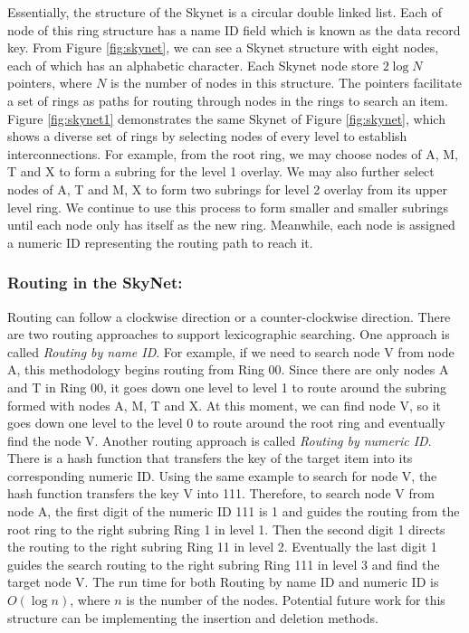 \documentclass[oribibl]{llncs}
\begin{document}
Essentially, the structure of the Skynet is a circular double linked list. Each of node of this ring structure has a name ID field which is known as the data record key. From Figure \ref{fig:skynet}, we can see a Skynet structure \cite{skip_net} with eight nodes, each of which has an alphabetic character. Each Skynet node store $2\log{N}$ pointers, where $N$ is the number of nodes in this structure. The pointers facilitate a set of rings as paths for routing through nodes in the rings to search an item. Figure \ref{fig:skynet1} demonstrates the same Skynet of Figure \ref{fig:skynet}, which shows a diverse set of rings by selecting nodes of every level to establish interconnections. For example, from the root ring, we may choose nodes of A, M, T and X to form a subring for the level 1 overlay. We may also further select nodes of A, T and M, X to form two subrings for level 2 overlay from its upper level ring. We continue to use this process to form smaller and smaller subrings until each node only has itself as the new ring. Meanwhile, each node is assigned a numeric ID representing the routing path to reach it.

\subsubsection{Routing in the SkyNet:}

Routing can follow a clockwise direction or a counter-clockwise direction. There are two routing approaches to support lexicographic searching. One approach is called {\it Routing by name ID}. For example, if we need to search node V from node A, this methodology begins routing from Ring 00. Since there are only nodes A and T in Ring 00, it goes down one level to level 1 to route around the subring formed with nodes A, M, T and X. At this moment, we can find node V, so it goes down one level to the level 0 to route around the root ring and eventually find the node V. Another routing approach is called {\it Routing by numeric ID}. There is a hash function that transfers the key of the target item into its corresponding numeric ID. Using the same example to search for node V, the hash function transfers the key V into 111. Therefore, to search node V from node A, the first digit of the numeric ID 111 is 1 and guides the routing from the root ring to the right subring Ring 1 in level 1. Then the second digit 1 directs the routing to the right subring Ring 11 in level 2. Eventually the last digit 1 guides the search routing to the right subring Ring 111 in level 3 and find the target node V. The run time for both Routing by name ID and numeric ID is $O(\log{n})$, where $n$ is the number of the nodes.  Potential future work for this structure can be implementing the insertion and deletion methods.
\end{document}
